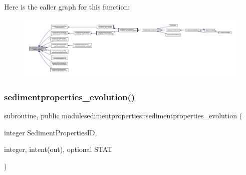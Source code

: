 Here is the caller graph for this function\+:\nopagebreak
\begin{figure}[H]
\begin{center}
\leavevmode
\includegraphics[width=350pt]{namespacemodulesedimentproperties_a30718f70ea81a445eb986292b5c9cd5f_icgraph}
\end{center}
\end{figure}
\mbox{\label{namespacemodulesedimentproperties_ac0e9a7cb95c81a6f95797a7750889730}} 
\subsubsection{\texorpdfstring{sedimentproperties\+\_\+evolution()}{sedimentproperties\_evolution()}}
{\footnotesize\ttfamily subroutine, public modulesedimentproperties\+::sedimentproperties\+\_\+evolution (\begin{DoxyParamCaption}\item[{integer}]{Sediment\+Properties\+ID,  }\item[{integer, intent(out), optional}]{S\+T\+AT }\end{DoxyParamCaption})}

